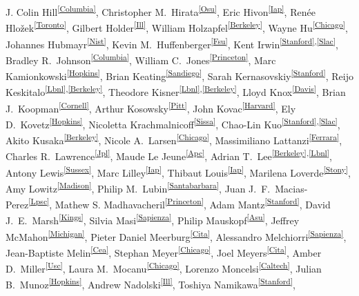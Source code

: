 \begin{raggedright}
J. Colin Hill\textsuperscript{\ref{Columbia}},
Christopher M.~Hirata\textsuperscript{\ref{Osu}},
Eric Hivon\textsuperscript{\ref{Iap}},
Ren\'{e}e Hlo\v{z}ek\textsuperscript{\ref{Toronto}},
Gilbert Holder\textsuperscript{\ref{Ill}},
William Holzapfel\textsuperscript{\ref{Berkeley}},
Wayne Hu\textsuperscript{\ref{Chicago}},
Johannes Hubmayr\textsuperscript{\ref{Nist}},
Kevin M.~Huffenberger\textsuperscript{\ref{Fsu}},
Kent Irwin\textsuperscript{\ref{Stanford},\ref{Slac}},
Bradley R.~Johnson\textsuperscript{\ref{Columbia}}, 
William C.~Jones\textsuperscript{\ref{Princeton}},
Marc Kamionkowski\textsuperscript{\ref{Hopkins}},
Brian Keating\textsuperscript{\ref{Sandiego}},
Sarah Kernasovskiy\textsuperscript{\ref{Stanford}},
Reijo Keskitalo\textsuperscript{\ref{Lbnl},\ref{Berkeley}},
Theodore Kisner\textsuperscript{\ref{Lbnl},\ref{Berkeley}},
Lloyd Knox\textsuperscript{\ref{Davis}},
Brian J.~Koopman\textsuperscript{\ref{Cornell}},
Arthur Kosowsky\textsuperscript{\ref{Pitt}},
John Kovac\textsuperscript{\ref{Harvard}},
Ely D.~Kovetz\textsuperscript{\ref{Hopkins}},
Nicoletta Krachmalnicoff\textsuperscript{\ref{Sissa}},
Chao-Lin Kuo\textsuperscript{\ref{Stanford},\ref{Slac}},
Akito Kusaka\textsuperscript{\ref{Berkeley}},
Nicole A.~Larsen\textsuperscript{\ref{Chicago}},
Massimiliano Lattanzi\textsuperscript{\ref{Ferrara}},
Charles R.~Lawrence\textsuperscript{\ref{Jpl}},
Maude Le Jeune\textsuperscript{\ref{Apc}},
Adrian T.~Lee\textsuperscript{\ref{Berkeley},\ref{Lbnl}},
Antony Lewis\textsuperscript{\ref{Sussex}},
Marc Lilley\textsuperscript{\ref{Iap}},
Thibaut Louis\textsuperscript{\ref{Iap}},
Marilena Loverde\textsuperscript{\ref{Stony}},
Amy Lowitz\textsuperscript{\ref{Madison}},
Philip M.~Lubin\textsuperscript{\ref{Santabarbara}},
Juan J.~F.~Macias-Perez\textsuperscript{\ref{Lpsc}},
Mathew S. Madhavacheril\textsuperscript{\ref{Princeton}},
Adam Mantz\textsuperscript{\ref{Stanford}},
David J.~E.~Marsh\textsuperscript{\ref{Kings}},
Silvia Masi\textsuperscript{\ref{Sapienza}},
Philip Mauskopf\textsuperscript{\ref{Asu}},
Jeffrey McMahon\textsuperscript{\ref{Michigan}},
Pieter Daniel Meerburg\textsuperscript{\ref{Cita}},
Alessandro Melchiorri\textsuperscript{\ref{Sapienza}},
Jean-Baptiste Melin\textsuperscript{\ref{Cea}},
Stephan Meyer\textsuperscript{\ref{Chicago}},
Joel Meyers\textsuperscript{\ref{Cita}},
Amber D.~Miller\textsuperscript{\ref{Usc}},
Laura M.~Mocanu\textsuperscript{\ref{Chicago}},
Lorenzo Moncelsi\textsuperscript{\ref{Caltech}},
Julian B.~Munoz\textsuperscript{\ref{Hopkins}},
Andrew Nadolski\textsuperscript{\ref{Ill}},
Toshiya Namikawa\textsuperscript{\ref{Stanford}},

\end{raggedright}
